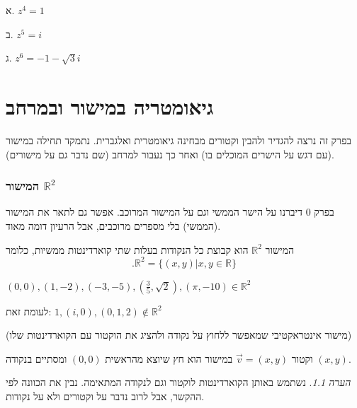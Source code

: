 \documentclass[
  hebrew,
  12pt,
  a4paper,
  oneside]{book}
\theoremstyle{definition}
\theoremstyle{remark}
\theoremstyle{plain}
\theoremstyle{remark}
\newtheorem*{remark}{הערה}
\begin{document}
א. \(z^{4}=1\)

ב. \(z^{5}=i\)

ג. \(z^{6}=-1-\sqrt{3}i\)


\chapter{גיאומטריה במישור
ובמרחב}\label{ux5d2ux5d9ux5d0ux5d5ux5deux5d8ux5e8ux5d9ux5d4-ux5d1ux5deux5d9ux5e9ux5d5ux5e8-ux5d5ux5d1ux5deux5e8ux5d7ux5d1}

בפרק זה נרצה להגדיר ולהבין וקטורים מבחינה גיאומטרית ואלגברית. נתמקד
תחילה במישור (עם דגש על הישרים המוכלים בו) ואחר כך נעבור למרחב (שם נדבר
גם על מישורים).

\subsection{\texorpdfstring{המישור
\(\mathbb{R}^2\)}{המישור \textbackslash mathbb\{R\}\^{}2}}\label{ux5d4ux5deux5d9ux5e9ux5d5ux5e8-mathbbr2}

בפרק \(0\) דיברנו על הישר הממשי וגם על המישור המרוכב. אפשר גם לתאר את
המישור (הממשי) בלי מספרים מרוכבים, אבל הרעיון דומה מאוד.

\begin{definition}

המישור \(\mathbb{R}^2\) הוא קבוצת כל הנקודות בעלות שתי קוארדינטות
ממשיות, כלומר \[.\mathbb{R}^{2}=\{(x,y)|x,y\in\mathbb{R}\}\]

\end{definition}

\begin{example}

\((0,0),(1,-2),(-3,-5),(\frac{3}{5},\sqrt{2}),(\pi,-10)\in\mathbb{R}^{2}\)

לעומת זאת: \(1,(i,0),(0,1,2)\notin\mathbb{R}^{2}\)

\end{example}

(מישור אינטראקטיבי שמאפשר ללחוץ על נקודה ולהציג את הוקטור עם הקוארדינטות
שלו)

\begin{definition}

וקטור \(\vec{v}=(x,y)\) במישור הוא חץ שיוצא מהראשית \((0,0)\) ומסתיים
בנקודה \((x,y)\).

\end{definition}

\begin{remark}
נשתמש באותן הקוארדינטות לוקטור וגם לנקודה המתאימה. נבין את הכוונה לפי
ההקשר, אבל לרוב נדבר על וקטורים ולא על נקודות.
\end{remark}
\end{document}
